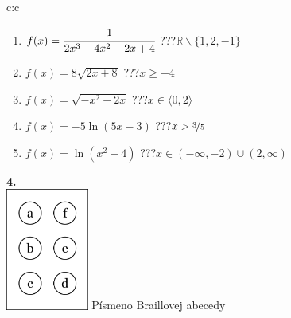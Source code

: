 \documentclass[10pt]{report}
\begin{document}
\begin{tabular}{c:c}
\begin{minipage}[c][104.5mm][t]{0.5\linewidth}
\begin{center}
\begin{minipage}{0.79\linewidth}
\begin{center}
\begin{varwidth}{\linewidth}
\begin{enumerate}
\item $f(x)=\cfrac{1}{2x^3-4x^2-2x+4}$\quad \dotfill\; ???\;\dotfill \quad $\mathbb{R}\smallsetminus\{1,2,-1\}$
\item $f(x)=8\sqrt{2x+8}$\quad \dotfill\; ???\;\dotfill \quad $x\geq-4$
\item $f(x)=\sqrt{-x^2-2x}$\quad \dotfill\; ???\;\dotfill \quad $x\in\langle0 , 2\rangle$
\item $f(x)=-5\ln{(5x-3)}$\quad \dotfill\; ???\;\dotfill \quad $x>\nicefrac{3}{5}$
\item $f(x)=\ln{(x^2-4)}$\quad \dotfill\; ???\;\dotfill \quad $x\in(-\infty , -2)\cup(2 , \infty)$
\end{enumerate}
\end{varwidth}
\end{center}
\end{minipage}
\begin{minipage}{0.20\linewidth}
\begin{center}
{\Huge\bfseries 4.} \\[2mm]
\includegraphics[height=40mm]{../images/braille.png}
{\small Písmeno Braillovej abecedy}
\end{center}
\end{minipage}
\end{center}
\end{minipage}
%
\end{tabular}
\newpage
\thispagestyle{empty}
\end{document}
